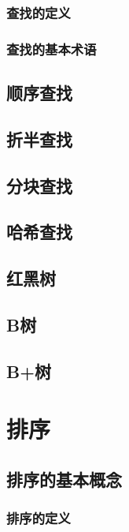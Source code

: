 \documentclass[lang=cn,newtx,10pt,scheme=chinese]{elegantbook}
\begin{document}
\subsection{查找的定义}

\subsection{查找的基本术语}

\section{顺序查找}

\section{折半查找}

\section{分块查找}

\section{哈希查找}

\section{红黑树}

\section{B树}

\section{B+树}

\chapter{排序}

\section{排序的基本概念}

\subsection{排序的定义}
\end{document}
